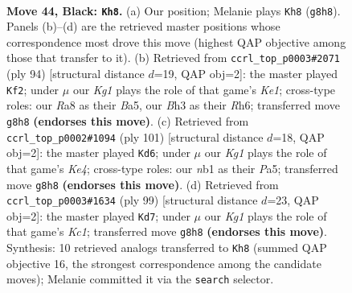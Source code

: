 \documentclass[11pt]{article}
\begin{document}
\clearpage

\begin{figure}[p]\centering
\begin{subfigure}{0.46\textwidth}\centering
\resizebox{\linewidth}{!}{%
\newchessgame
\chessboard[
  setfen={r5k1/4R3/p1p5/8/8/B6b/8/1N2K3 b - - 0 44},
  showmover=false,
  pgfstyle=straightmove, color=movearrow, markmove={g8-h8}
]}
\caption{}
\end{subfigure}\hfill
\begin{subfigure}{0.46\textwidth}\centering
\resizebox{\linewidth}{!}{%
\newchessgame
\chessboard[
  setfen={8/8/7R/Bbr5/8/8/2k4P/4K3 w - - 2 48},
  showmover=false,
  pgfstyle=straightmove, color=movearrow, markmove={e1-f2}
]}
\caption{}
\end{subfigure}
\\[4pt]
\begin{subfigure}{0.46\textwidth}\centering
\resizebox{\linewidth}{!}{%
\newchessgame
\chessboard[
  setfen={8/r7/7p/p3kp2/B7/8/2R4K/8 b - - 13 51},
  showmover=false,
  pgfstyle=straightmove, color=movearrow, markmove={e5-d6}
]}
\caption{}
\end{subfigure}\hfill
\begin{subfigure}{0.46\textwidth}\centering
\resizebox{\linewidth}{!}{%
\newchessgame
\chessboard[
  setfen={2k1r3/8/8/3B4/1K5R/8/6P1/b7 b - - 0 50},
  showmover=false,
  pgfstyle=straightmove, color=movearrow, markmove={c8-d7}
]}
\caption{}
\end{subfigure}
\caption{\textbf{Move 44, Black: \texttt{Kh8}.} (a) Our position; Melanie plays \texttt{Kh8} (\texttt{g8h8}). Panels (b)--(d) are the retrieved master positions whose correspondence most drove this move (highest QAP objective among those that transfer to it). (b) Retrieved from \texttt{ccrl\_top\_p0003\#2071} (ply 94) [structural distance $d$=19, QAP obj=2]: the master played \texttt{Kf2}; under $\mu$ our \emph{Kg1} plays the role of that game's \emph{Ke1}; cross-type roles: our \emph{R}a8 as their \emph{B}a5, our \emph{B}h3 as their \emph{R}h6; transferred move \texttt{g8h8} \textbf{(endorses this move)}. (c) Retrieved from \texttt{ccrl\_top\_p0002\#1094} (ply 101) [structural distance $d$=18, QAP obj=2]: the master played \texttt{Kd6}; under $\mu$ our \emph{Kg1} plays the role of that game's \emph{Ke4}; cross-type roles: our \emph{n}b1 as their \emph{P}a5; transferred move \texttt{g8h8} \textbf{(endorses this move)}. (d) Retrieved from \texttt{ccrl\_top\_p0003\#1634} (ply 99) [structural distance $d$=23, QAP obj=2]: the master played \texttt{Kd7}; under $\mu$ our \emph{Kg1} plays the role of that game's \emph{Kc1}; transferred move \texttt{g8h8} \textbf{(endorses this move)}. Synthesis: 10 retrieved analogs transferred to \texttt{Kh8} (summed QAP objective 16, the strongest correspondence among the candidate moves); Melanie committed it via the \texttt{search} selector.}
\label{fig:thought-m87}
\end{figure}
\end{document}
